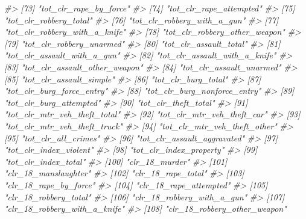 \documentclass[
  12pt,
  openany]{book}
\newenvironment{Shaded}{\begin{snugshade}}{\end{snugshade}}
\newcommand{\CommentTok}[1]{\textcolor[rgb]{0.37,0.37,0.37}{\textit{#1}}}
\begin{document}
\begin{Shaded}
\begin{Highlighting}[]
\CommentTok{\#\textgreater{}  [73] "tot\_clr\_rape\_by\_force"         }
\CommentTok{\#\textgreater{}  [74] "tot\_clr\_rape\_attempted"        }
\CommentTok{\#\textgreater{}  [75] "tot\_clr\_robbery\_total"         }
\CommentTok{\#\textgreater{}  [76] "tot\_clr\_robbery\_with\_a\_gun"    }
\CommentTok{\#\textgreater{}  [77] "tot\_clr\_robbery\_with\_a\_knife"  }
\CommentTok{\#\textgreater{}  [78] "tot\_clr\_robbery\_other\_weapon"  }
\CommentTok{\#\textgreater{}  [79] "tot\_clr\_robbery\_unarmed"       }
\CommentTok{\#\textgreater{}  [80] "tot\_clr\_assault\_total"         }
\CommentTok{\#\textgreater{}  [81] "tot\_clr\_assault\_with\_a\_gun"    }
\CommentTok{\#\textgreater{}  [82] "tot\_clr\_assault\_with\_a\_knife"  }
\CommentTok{\#\textgreater{}  [83] "tot\_clr\_assault\_other\_weapon"  }
\CommentTok{\#\textgreater{}  [84] "tot\_clr\_assault\_unarmed"       }
\CommentTok{\#\textgreater{}  [85] "tot\_clr\_assault\_simple"        }
\CommentTok{\#\textgreater{}  [86] "tot\_clr\_burg\_total"            }
\CommentTok{\#\textgreater{}  [87] "tot\_clr\_burg\_force\_entry"      }
\CommentTok{\#\textgreater{}  [88] "tot\_clr\_burg\_nonforce\_entry"   }
\CommentTok{\#\textgreater{}  [89] "tot\_clr\_burg\_attempted"        }
\CommentTok{\#\textgreater{}  [90] "tot\_clr\_theft\_total"           }
\CommentTok{\#\textgreater{}  [91] "tot\_clr\_mtr\_veh\_theft\_total"   }
\CommentTok{\#\textgreater{}  [92] "tot\_clr\_mtr\_veh\_theft\_car"     }
\CommentTok{\#\textgreater{}  [93] "tot\_clr\_mtr\_veh\_theft\_truck"   }
\CommentTok{\#\textgreater{}  [94] "tot\_clr\_mtr\_veh\_theft\_other"   }
\CommentTok{\#\textgreater{}  [95] "tot\_clr\_all\_crimes"            }
\CommentTok{\#\textgreater{}  [96] "tot\_clr\_assault\_aggravated"    }
\CommentTok{\#\textgreater{}  [97] "tot\_clr\_index\_violent"         }
\CommentTok{\#\textgreater{}  [98] "tot\_clr\_index\_property"        }
\CommentTok{\#\textgreater{}  [99] "tot\_clr\_index\_total"           }
\CommentTok{\#\textgreater{} [100] "clr\_18\_murder"                 }
\CommentTok{\#\textgreater{} [101] "clr\_18\_manslaughter"           }
\CommentTok{\#\textgreater{} [102] "clr\_18\_rape\_total"             }
\CommentTok{\#\textgreater{} [103] "clr\_18\_rape\_by\_force"          }
\CommentTok{\#\textgreater{} [104] "clr\_18\_rape\_attempted"         }
\CommentTok{\#\textgreater{} [105] "clr\_18\_robbery\_total"          }
\CommentTok{\#\textgreater{} [106] "clr\_18\_robbery\_with\_a\_gun"     }
\CommentTok{\#\textgreater{} [107] "clr\_18\_robbery\_with\_a\_knife"   }
\CommentTok{\#\textgreater{} [108] "clr\_18\_robbery\_other\_weapon"   }

\end{Highlighting}
\end{Shaded}
\end{document}
